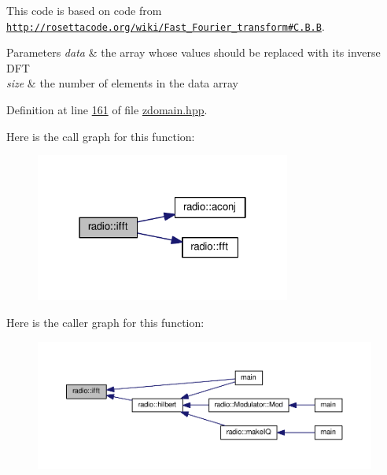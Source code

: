 This code is based on code from \href{http://rosettacode.org/wiki/Fast_Fourier_transform#C.2B.2B}{\tt http\+://rosettacode.\+org/wiki/\+Fast\+\_\+\+Fourier\+\_\+transform\#\+C.\+B.\+B}.


\begin{DoxyParams}{Parameters}
{\em data} & the array whose values should be replaced with its inverse D\+F\+T\\
\hline
{\em size} & the number of elements in the data array \\
\hline
\end{DoxyParams}


Definition at line \hyperlink{zdomain_8hpp_source_l00161}{161} of file \hyperlink{zdomain_8hpp_source}{zdomain.\+hpp}.



Here is the call graph for this function\+:
\nopagebreak
\begin{figure}[H]
\begin{center}
\leavevmode
\includegraphics[width=238pt]{namespaceradio_a51add4e2faf6d58cabc3b4a3892420eb_cgraph}
\end{center}
\end{figure}




Here is the caller graph for this function\+:
\nopagebreak
\begin{figure}[H]
\begin{center}
\leavevmode
\includegraphics[width=350pt]{namespaceradio_a51add4e2faf6d58cabc3b4a3892420eb_icgraph}
\end{center}
\end{figure}


